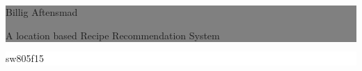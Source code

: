 %
%
%
%
	\thispagestyle{empty}

	\vspace*{\fill}

	\noindent \colorbox{gray}{
		\parbox{\textwidth}{%
			\color{white}%
			\begin{center}
				\Huge{{\selectfont Billig Aftensmad}} %
			\end{center}
			\begin{center}
			\Large{\textsf{A location based Recipe Recommendation System}}\\
			[0.5cm] %
			\small{
			}
			\end{center}
		}}
		
	\vfill


	\begin{figure}[htbp]
	\centering
	\vspace{140px}
	\end{figure}
	
	\noindent \colorbox{white}{
		\begin{minipage}[b]{6.5cm}
		\begin{center}
			\end{center}
			\vspace*{-20px}
		\end{minipage}
	} 
	\hfill  
	\colorbox{white}{ 
		\begin{minipage}[b]{3.5cm}	 
			\flushright
			{\large sw805f15} \\
		\end{minipage}
	}

\clearpage
